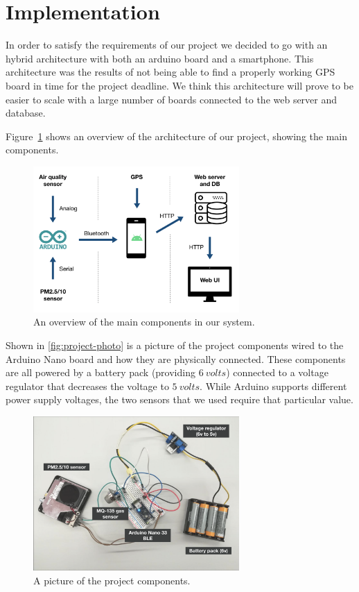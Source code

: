 \documentclass[12pt]{article}
\begin{document}
  \section{Implementation}
  In order to satisfy the requirements of our project we decided to go with an hybrid architecture with both an arduino board and a smartphone. This architecture was the results of not being able to find a properly working GPS board in time for the project deadline. We think this architecture will prove to be easier to scale with a large number of boards connected to the web server and database.

  Figure~\ref{fig:architecture} shows an overview of the architecture of our project, showing the main components.
  \begin{figure}[H]
    \centering
    \includegraphics[width=0.7\textwidth]{images/architecture.png}
    \caption{An overview of the main components in our system.}
    \label{fig:architecture}
  \end{figure}

  Shown in \autoref{fig:project-photo} is a picture of the project components wired to the Arduino Nano board and how they are physically connected. These components are all powered by a battery pack (providing $6\ volts$) connected to a voltage regulator that decreases the voltage to $5\ volts$. While Arduino supports different power supply voltages, the two sensors that we used require that particular value.
  \begin{figure}[H]
    \centering
    \includegraphics[width=0.7\textwidth]{images/project-all.png}
    \caption{A picture of the project components.}
    \label{fig:project-photo}
  \end{figure}
  
\end{document}
